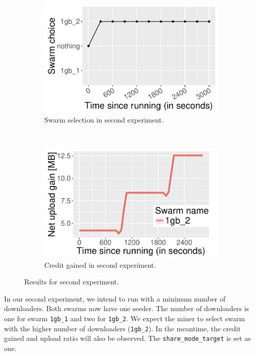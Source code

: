 \begin{figure}[h]
	\begin{subfigure}[t]{0.5\textwidth}
		\centering
		\includegraphics[width=\textwidth]{pics/results/valgain0.pdf}
		\caption{Swarm selection in second experiment.}
		\label{fig:val0gain}
	\end{subfigure}
	~
	\begin{subfigure}[t]{0.5\textwidth}
		\centering
		\includegraphics[width=\textwidth]{pics/results/valgain.pdf}
		\caption{Credit gained in second experiment.}
		\label{fig:vgain}
	\end{subfigure}
	\caption{Results for second experiment.}
\end{figure}

In our second experiment, we intend to run with a minimum number of downloaders. Both swarms now have one seeder. The number of downloaders is one for swarm \texttt{1gb\_1} and two  for \texttt{1gb\_2}. We expect the miner to select swarm with the higher number of downloaders (\texttt{1gb\_2}). In the meantime, the credit gained and upload ratio will also be observed. The \texttt{share\_mode\_target} is set as one.

